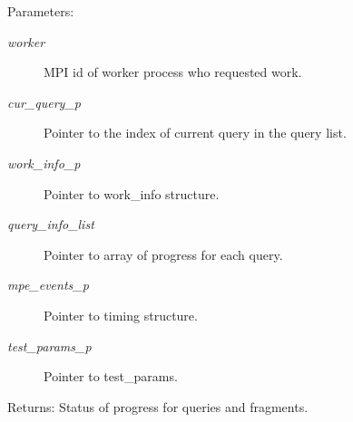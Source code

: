 \begin{Desc}
\item[Parameters:]
\begin{description}
\item[{\em worker}]MPI id of worker process who requested work. \item[{\em cur\_\-query\_\-p}]Pointer to the index of current query in the query list. \item[{\em work\_\-info\_\-p}]Pointer to work\_\-info structure. \item[{\em query\_\-info\_\-list}]Pointer to array of progress for each query. \item[{\em mpe\_\-events\_\-p}]Pointer to timing structure. \item[{\em test\_\-params\_\-p}]Pointer to test\_\-params. \end{description}
\end{Desc}
\begin{Desc}
\item[Returns:]Status of progress for queries and fragments. \end{Desc}

